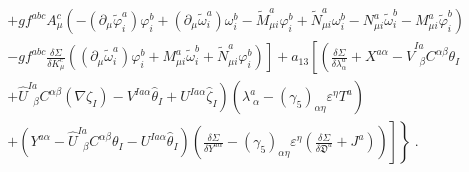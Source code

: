 \begin{appendix}
\begin{eqnarray}
&&
+ gf^{abc}A^{c}_{\mu}
  \left(
- (\partial_{\mu}\tilde{\varphi}^{a}_{i})\varphi^{b}_{i}
+ (\partial_{\mu}\tilde{\omega}^{a}_{i})\omega^{b}_{i}
- \tilde{M}^{a}_{\mu i}\varphi^{b}_{i}
+ \tilde{N}^{a}_{\mu i}\omega^{b}_{i}
-  N^{a}_{\mu i}\tilde{\omega}^{b}_{i}
- M^{a}_{\mu i}\tilde{\varphi}^{b}_{i}
\right)
\nonumber \\
&&
\left.
- gf^{abc}\frac{\delta\Sigma}{\delta K^{c}_{\mu}}
\left( 
 (\partial_{\mu}\tilde{\omega}^{a}_{i})\varphi^{b}_{i}
+ M^{a}_{\mu i}\tilde{\omega}^{b}_{i}
+ \tilde{N}^{a}_{\mu i}\varphi^{b}_{i}
\right)
\right]
+ a_{13}\left[ 
\left(\frac{\delta\Sigma}{\delta\lambda^{a}_{\alpha}}+X^{a\alpha}
- \hat{V}^{Ia}_{\;\;\beta}C^{\alpha\beta}\theta_{I}
\right.
\right.
\nonumber \\
&&
\left.
+ \hat{U}^{Ia}_{\;\;\beta}C^{\alpha\beta}(\nabla\zeta_{I})
- V^{Ia\alpha}\hat{\theta}_{I}
+ U^{Ia\alpha}\hat{\zeta}_{I}
\right)
\left(
  \lambda^{a}_{\;\alpha}
- (\gamma_{5})_{\alpha\eta}\varepsilon^{\eta}T^{a}
\right)
\nonumber \\
&&
\left.
\left.
+ \left(
  Y^{a\alpha}
- \hat{U}^{Ia}_{\;\;\beta}C^{\alpha\beta}\theta_{I}
- U^{Ia\alpha}\hat{\theta}_{I}
\right)
\left(
\frac{\delta\Sigma}{\delta Y^{a\alpha}}
- (\gamma_{5})_{\alpha\eta}\varepsilon^{\eta}
\left( \frac{\delta\Sigma}{\delta\mathfrak{D}^{a}} + J^{a} \right)
\right)
\right]
\right\}\;.
\end{eqnarray}


\end{appendix}
